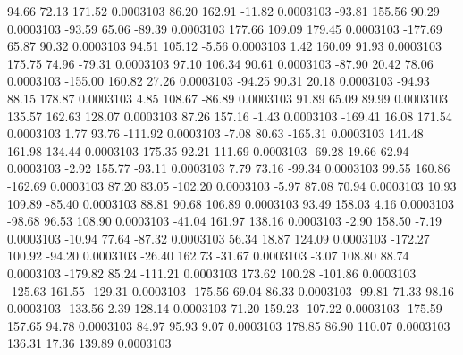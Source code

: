        94.66       72.13      171.52     0.0003103
       86.20      162.91      -11.82     0.0003103
      -93.81      155.56       90.29     0.0003103
      -93.59       65.06      -89.39     0.0003103
      177.66      109.09      179.45     0.0003103
     -177.69       65.87       90.32     0.0003103
       94.51      105.12       -5.56     0.0003103
        1.42      160.09       91.93     0.0003103
      175.75       74.96      -79.31     0.0003103
       97.10      106.34       90.61     0.0003103
      -87.90       20.42       78.06     0.0003103
     -155.00      160.82       27.26     0.0003103
      -94.25       90.31       20.18     0.0003103
      -94.93       88.15      178.87     0.0003103
        4.85      108.67      -86.89     0.0003103
       91.89       65.09       89.99     0.0003103
      135.57      162.63      128.07     0.0003103
       87.26      157.16       -1.43     0.0003103
     -169.41       16.08      171.54     0.0003103
        1.77       93.76     -111.92     0.0003103
       -7.08       80.63     -165.31     0.0003103
      141.48      161.98      134.44     0.0003103
      175.35       92.21      111.69     0.0003103
      -69.28       19.66       62.94     0.0003103
       -2.92      155.77      -93.11     0.0003103
        7.79       73.16      -99.34     0.0003103
       99.55      160.86     -162.69     0.0003103
       87.20       83.05     -102.20     0.0003103
       -5.97       87.08       70.94     0.0003103
       10.93      109.89      -85.40     0.0003103
       88.81       90.68      106.89     0.0003103
       93.49      158.03        4.16     0.0003103
      -98.68       96.53      108.90     0.0003103
      -41.04      161.97      138.16     0.0003103
       -2.90      158.50       -7.19     0.0003103
      -10.94       77.64      -87.32     0.0003103
       56.34       18.87      124.09     0.0003103
     -172.27      100.92      -94.20     0.0003103
      -26.40      162.73      -31.67     0.0003103
       -3.07      108.80       88.74     0.0003103
     -179.82       85.24     -111.21     0.0003103
      173.62      100.28     -101.86     0.0003103
     -125.63      161.55     -129.31     0.0003103
     -175.56       69.04       86.33     0.0003103
      -99.81       71.33       98.16     0.0003103
     -133.56        2.39      128.14     0.0003103
       71.20      159.23     -107.22     0.0003103
     -175.59      157.65       94.78     0.0003103
       84.97       95.93        9.07     0.0003103
      178.85       86.90      110.07     0.0003103
      136.31       17.36      139.89     0.0003103
